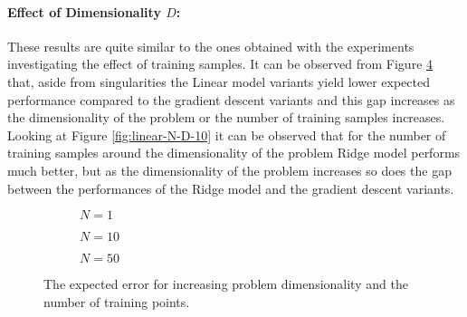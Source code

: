 \paragraph{Effect of Dimensionality $D$:} These results are quite similar to the ones obtained with the experiments investigating the effect of training samples. It can be observed from Figure \ref{fig:linear-D} that, aside from singularities the Linear model variants yield lower expected performance compared to the gradient descent variants and this gap increases as the dimensionality of the problem or the number of training samples increases. Looking at Figure \ref{fig:linear-N-D-10} it can be observed that for the number of training samples around the dimensionality of the problem Ridge model performs much better, but as the dimensionality of the problem increases so does the gap between the performances of the Ridge model and the gradient descent variants.

\begin{figure}[!h]
  \centering
    \begin{subfigure}{0.3\textwidth}
      \centering
      \caption{$N=1$}
      \label{fig:linear-D-N-1}
    \end{subfigure}
    \begin{subfigure}{0.3\textwidth}
      \centering
      \caption{$N=10$}
      \label{fig:linear-D-N-10}
    \end{subfigure}
    \begin{subfigure}{0.3\textwidth}
      \centering
      \caption{$N=50$}
      \label{fig:linear-D-N-50}
    \end{subfigure}
  \caption{The expected error for increasing problem dimensionality and the number of training points.}\label{fig:linear-D}
\end{figure}


